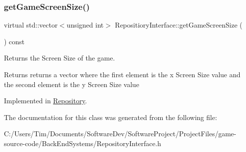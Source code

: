\subsubsection{\texorpdfstring{get\+Game\+Screen\+Size()}{getGameScreenSize()}}
{\footnotesize\ttfamily virtual std\+::vector$<$unsigned int$>$ Repositiory\+Interface\+::get\+Game\+Screen\+Size (\begin{DoxyParamCaption}{ }\end{DoxyParamCaption}) const\hspace{0.3cm}{\ttfamily [pure virtual]}}



Returns the Screen Size of the game. 

\begin{DoxyReturn}{Returns}
returns a vector where the first element is the x Screen Size value and the second element is the y Screen Size value 
\end{DoxyReturn}


Implemented in \hyperlink{class_repository_ab369b3a1d2957b2bd3130c8c348343dd}{Repository}.



The documentation for this class was generated from the following file\+:\begin{DoxyCompactItemize}
\item 
C\+:/\+Users/\+Tim/\+Documents/\+Software\+Dev/\+Software\+Project/\+Project\+Files/game-\/source-\/code/\+Back\+End\+Systems/Repository\+Interface.\+h\end{DoxyCompactItemize}
